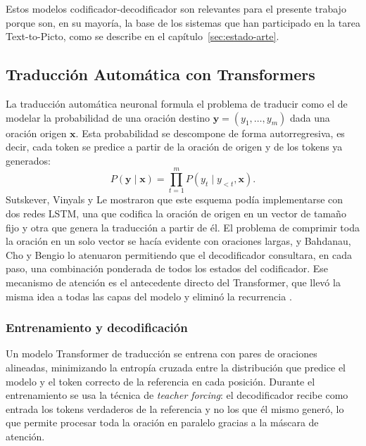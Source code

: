 Estos modelos codificador-decodificador son relevantes para el presente trabajo porque son, en su mayoría, la base de los sistemas que han participado en la tarea Text-to-Picto, como se describe en el capítulo~\ref{sec:estado-arte}.

\vspace{0.5cm}
\subsection{Traducción Automática con Transformers}
\vspace{0.2cm}

La traducción automática neuronal formula el problema de traducir como el de modelar la probabilidad de una oración destino $\mathbf{y} = (y_1, \dots, y_m)$ dada una oración origen $\mathbf{x}$. Esta probabilidad se descompone de forma autorregresiva, es decir, cada token se predice a partir de la oración de origen y de los tokens ya generados:
\begin{equation}
P(\mathbf{y} \mid \mathbf{x}) = \prod_{t=1}^{m} P(y_t \mid y_{<t}, \mathbf{x}).
\end{equation}
Sutskever, Vinyals y Le \cite{sutskever2014sequence} mostraron que este esquema podía implementarse con dos redes LSTM, una que codifica la oración de origen en un vector de tamaño fijo y otra que genera la traducción a partir de él. El problema de comprimir toda la oración en un solo vector se hacía evidente con oraciones largas, y Bahdanau, Cho y Bengio \cite{bahdanau2015neural} lo atenuaron permitiendo que el decodificador consultara, en cada paso, una combinación ponderada de todos los estados del codificador. Ese mecanismo de atención es el antecedente directo del Transformer, que llevó la misma idea a todas las capas del modelo y eliminó la recurrencia \cite{vaswani2017attention}.


\subsubsection{Entrenamiento y decodificación}


Un modelo Transformer de traducción se entrena con pares de oraciones alineadas, minimizando la entropía cruzada entre la distribución que predice el modelo y el token correcto de la referencia en cada posición. Durante el entrenamiento se usa la técnica de \textit{teacher forcing}: el decodificador recibe como entrada los tokens verdaderos de la referencia y no los que él mismo generó, lo que permite procesar toda la oración en paralelo gracias a la máscara de atención.

